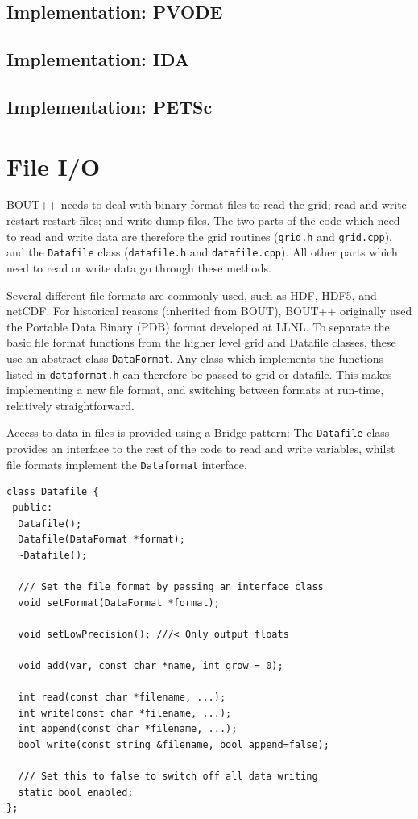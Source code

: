 \documentclass[12pt]{article}
\newcommand{\code}[1]{\texttt{#1}}
\begin{document}
\subsection{Implementation: PVODE}


\subsection{Implementation: IDA}

\subsection{Implementation: PETSc}

\section{File I/O}

BOUT++ needs to deal with binary format files to read the grid;
read and write restart restart files; and write dump files. 
The two parts of the code which need to read and write data are therefore
the grid routines (\code{grid.h} and \code{grid.cpp}), and the
\code{Datafile} class (\code{datafile.h} and \code{datafile.cpp}).
All other parts which need to read or write data go through these
methods.

Several different file formats are commonly used, such as HDF, HDF5, and netCDF. 
For historical reasons (inherited from BOUT), BOUT++ originally used the
Portable Data Binary (PDB) format developed at LLNL. 
To separate the basic file format functions from the higher level grid and 
Datafile classes, these use an abstract class \code{DataFormat}. Any
class which implements the functions listed in \code{dataformat.h}
can therefore be passed to grid or datafile. This makes implementing
a new file format, and switching between formats at run-time, 
relatively straightforward.


Access to data in files is provided using a Bridge pattern: The
\code{Datafile} class provides an interface to the rest of the code
to read and write variables, whilst file formats implement the
\code{Dataformat} interface. 
\begin{lstlisting}
class Datafile {
 public:
  Datafile();
  Datafile(DataFormat *format);
  ~Datafile();
  
  /// Set the file format by passing an interface class
  void setFormat(DataFormat *format);

  void setLowPrecision(); ///< Only output floats

  void add(var, const char *name, int grow = 0);

  int read(const char *filename, ...);
  int write(const char *filename, ...);
  int append(const char *filename, ...);
  bool write(const string &filename, bool append=false);

  /// Set this to false to switch off all data writing
  static bool enabled;
};
\end{lstlisting}
\end{document}
